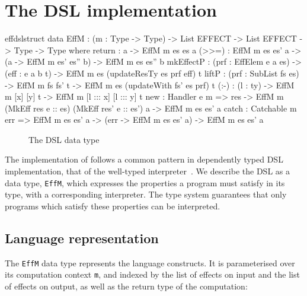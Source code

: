 \section{The \Eff{} DSL implementation}

\label{sect:effimpl}

\begin{SaveVerbatim}{effdslstruct}
data EffM : (m : Type -> Type) -> List EFFECT -> List EFFECT -> Type -> Type where
     return    : a -> EffM m es es a
     (>>=)     : EffM m es es' a -> (a -> EffM m es' es'' b) -> EffM m es es'' b
     mkEffectP : (prf : EffElem e a es) -> (eff : e a b t) -> EffM m es (updateResTy es prf eff) t
     liftP     : (prf : SubList fs es) -> EffM m fs fs' t -> EffM m es (updateWith fs' es prf) t
     (:-)      : (l : ty) -> EffM m [x] [y] t -> EffM m [l ::: x] [l ::: y] t
     new       : Handler e m => 
                 res -> EffM m (MkEff res e :: es) (MkEff res' e :: es') a -> EffM m es es' a
     catch     : Catchable m err => 
                 EffM m es es' a -> (err -> EffM m es es' a) -> EffM m es es' a
\end{SaveVerbatim}

\begin{figure*}[t]
\begin{center}
\end{center}
\caption{The \Eff{} DSL data type}
\label{effdsltype}
\end{figure*}

The implementation of \Eff{} follows a common pattern in dependently typed DSL
implementation, that of the well-typed
interpreter~\cite{augustsson1999exercise,Brady2006a,Pasalic2002}. We describe
the DSL as a data type, \texttt{EffM}, which expresses the properties a program
must satisfy in its type, with a corresponding interpreter. The type system
guarantees that only programs which satisfy these properties 
can be interpreted.

\subsection{Language representation}


The \texttt{EffM} data type represents the \Eff{} language constructs.
It is parameterised over its computation context \texttt{m},
and indexed by the list of effects on input and the list of effects on output,
as well as the return type of the computation:

